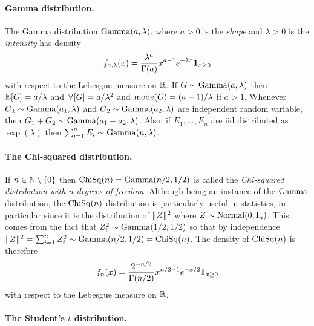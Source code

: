 \paragraph{Gamma distribution.} %

The Gamma distribution $\operatorname{Gamma}(a, \lambda)$, where $a > 0$ is the \emph{shape} and $\lambda > 0$ is the \emph{intensity} has density
\begin{equation*}
	f_{a, \lambda}(x) = \frac{\lambda^a}{\Gamma(a)} x^{a - 1} e^{-\lambda x} \mathbf 1_{x \geq 0}
\end{equation*}
with respect to the Lebesgue measure on $\mathbb R$.
%
If $G \sim \operatorname{Gamma}(a, \lambda)$ then $\mathbb E[G] = a / \lambda$ and $\mathbb V[G] = a / \lambda^2$ and $\operatorname{mode}(G) = (a - 1) / \lambda$ if $a > 1$.
Whenever $G_1 \sim \operatorname{Gamma}(a_1, \lambda)$ and $G_2 \sim \operatorname{Gamma}(a_2, \lambda)$ are independent random variable, then $G_1 + G_2 \sim \operatorname{Gamma}(a_1 + a_2, \lambda)$.
Also, if $E_1, \ldots, E_n$ are iid distributed as $\exp(\lambda)$ then $\sum_{i=1}^n E_i \sim \operatorname{Gamma}(n, \lambda)$.

\paragraph{The Chi-squared distribution.} %

If $n \in \mathbb N \setminus \{ 0 \}$ then $\operatorname{ChiSq}(n) = \operatorname{Gamma}(n/2, 1/2)$ is called the \emph{Chi-squared distribution with $n$ degrees of freedom}.
Although being an instance of the $\operatorname{Gamma}$ distribution, the $\operatorname{ChiSq}(n)$ distribution is particularly useful  in statistics, in particular since it is the distribution of $\| Z \|^2$ where $Z \sim \operatorname{Normal}(0, \operatorname{{\boldsymbol I}}_n)$. 
This comes from the fact that $Z_i^2 \sim \operatorname{Gamma}(1/2, 1/2)$ so that by independence $\| Z \|^2 = \sum_{i=1}^n Z_i^2 \sim \operatorname{Gamma}(n/2, 1/2) = \operatorname{ChiSq}(n)$.
The density of $\operatorname{ChiSq}(n)$ is therefore 
\begin{equation*}
	f_n(x) = \frac{2^{-n / 2}}{\Gamma(n/2)} x^{n / 2 - 1} e^{-x / 2} \mathbf 1_{x \geq 0}
\end{equation*}
with respect to the Lebesgue measure on $\mathbb R$.

\paragraph{The Student's $t$ distribution.} %

